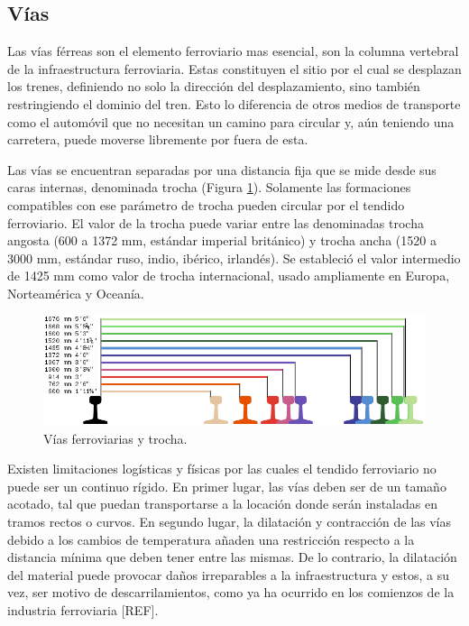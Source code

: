 \subsection{Vías}

Las vías férreas son el elemento ferroviario mas esencial, son la columna vertebral de la infraestructura ferroviaria. Estas constituyen el sitio por el cual se desplazan los trenes, definiendo no solo la dirección del desplazamiento, sino también restringiendo el dominio del tren. Esto lo diferencia de otros medios de transporte como el automóvil que no necesitan un camino para circular y, aún teniendo una carretera, puede moverse libremente por fuera de esta.

Las vías se encuentran separadas por una distancia fija que se mide desde sus caras internas, denominada trocha (Figura \ref{fig:vias_1}). Solamente las formaciones compatibles con ese parámetro de trocha pueden circular por el tendido ferroviario. El valor de la trocha puede variar entre las denominadas trocha angosta (600 a 1372 mm, estándar imperial británico) y trocha ancha (1520 a 3000 mm, estándar ruso, indio, ibérico, irlandés). Se estableció el valor intermedio de 1425 mm como valor de trocha internacional, usado ampliamente en Europa, Norteamérica y Oceanía.

    \begin{figure}[!h]
        \centering
        \includegraphics[width=1\textwidth]{Figuras/trocha.png}
        \centering\caption{Vías ferroviarias y trocha.}
        \label{fig:vias_1}
    \end{figure}
    
Existen limitaciones logísticas y físicas por las cuales el tendido ferroviario no puede ser un continuo rígido. En primer lugar, las vías deben ser de un tamaño acotado, tal que puedan transportarse a la locación donde serán instaladas en tramos rectos o curvos. En segundo lugar, la dilatación y contracción de las vías debido a los cambios de temperatura añaden una restricción respecto a la distancia mínima que deben tener entre las mismas. De lo contrario, la dilatación del material puede provocar daños irreparables a la infraestructura y estos, a su vez, ser motivo de descarrilamientos, como ya ha ocurrido en los comienzos de la industria ferroviaria [REF]. 
    
